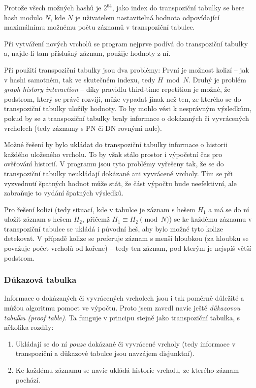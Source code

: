 \documentclass{article}
\begin{document}
Protože všech možných hashů je \(2^{64}\), jako index do transpoziční tabulky
se bere hash modulo \(N\), kde \(N\) je uživatelem nastavitelná hodnota 
odpovídající maximálnímu možnému počtu záznamů v transpoziční tabulce.

Při vytváření nových vrcholů se program nejprve podívá do transpoziční tabulky
a, najde-li tam příslušný záznam, použije hodnoty z ní.

Při použití transpoziční tabulky jsou dva problémy: První je možnost kolizí --
jak v hashi samotném, tak ve skutečném indexu, tedy \(H \bmod N\). Druhý je
problém \emph{graph history interaction} -- díky pravidlu third-time repetition
je možné, že podstrom, který se právě rozvíjí, může vypadat jinak než ten, ze
kterého se do transpoziční tabulky uložily hodnoty. To by mohlo vést k 
nesprávným výsledkům, pokud by se z transpoziční tabulky braly informace o
dokázaných či vyvrácených vrcholech (tedy záznamy s PN či DN rovnými nule). 

Možné řešení by bylo ukládat do transpoziční tabulky informace o historii
každého uloženého vrcholu. To by však stálo prostor i výpočetní čas pro 
ověřování historií. V programu jsou tyto problémy vyřešeny tak, že se do
transpoziční tabulky neukládají dokázané ani vyvrácené vrcholy. Tím se při
vyzvednutí špatných hodnot může stát, že část výpočtu bude neefektivní, ale 
zabraňuje to vydání špatných výsledků.

Pro řešení kolizí (tedy situací, kde v tabulce je záznam s hešem \(H_1\) a má se
do ní uložit záznam s hešem \(H_2\), přičemž \(H_1 \equiv H_2 \pmod N\)) se ke
každému záznamu v transpoziční tabulce se ukládá i původní heš, aby bylo možné 
tyto kolize detekovat. V případě kolize se preferuje záznam s menší hloubkou (za 
hloubku se považuje počet vrcholů od kořene) -- tedy ten záznam, pod kterým 
je nejspíš větší podstrom.

\subsubsection{Důkazová tabulka}
\label{sec:heur-pt}
Informace o dokázaných či vyvrácených vrcholech jsou i tak poměrně důležité a
můžou algoritmu pomoct ve výpočtu. Proto jsem zavedl navíc ještě \emph{důkazovou
tabulku (proof table)}. Ta funguje v principu stejně jako transpoziční tabulka,
s několika rozdíly:\begin{enumerate}
\item Ukládají se do ní \emph{pouze} dokázané či vyvrácené vrcholy (tedy 
  informace v transpoziční a důkazové tabulce jsou navzájem disjunktní).
\item Ke každému záznamu se navíc ukládá historie vrcholu, ze kterého záznam
  pochází.
\end{enumerate}
\end{document}
